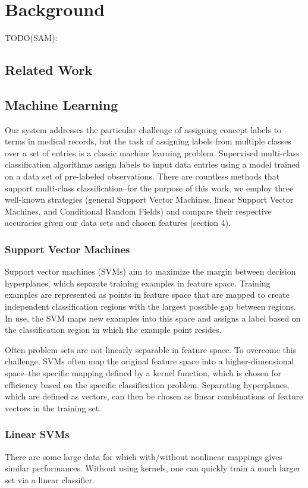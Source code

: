 \documentclass[preprint]{style}
\begin{document}
\section{Background}
TODO(SAM):
\subsection{Related Work}

\subsection{Machine Learning}

Our system addresses the particular challenge of assigning concept labels to terms in medical records, but the task of assigning labels from multiple classes over a set of entries is a classic machine learning problem. Supervised multi-class classification algorithms assign labels to input data entries using a model trained on a data set of pre-labeled observations. There are countless methods that support multi-class classification--for the purpose of this work, we employ three well-known strategies (general Support Vector Machines, linear Support Vector Machines, and Conditional Random Fields) and compare their respective accuracies given our data sets and chosen features (section 4).

\subsubsection{Support Vector Machines}
Support vector machines (SVMs) aim to maximize the margin between decision hyperplanes, which separate training examples in feature space. Training examples are represented as points in feature space that are mapped to create independent classification regions with the largest possible gap between regions. In use, the SVM maps new examples into this space and assigns a label based on the classification region in which the example point resides. 

Often problem sets are not linearly separable in feature space. To overcome this challenge, SVMs often map the original feature space into a higher-dimensional space--the specific mapping defined by a kernel function, which is chosen for efficiency based on the specific classification problem. Separating hyperplanes, which are defined as vectors, can then be chosen as linear combinations of feature vectors in the training set.

\subsubsection{Linear SVMs}
There are some large data for which with/without nonlinear mappings gives similar performances. Without using kernels, one can quickly train a much larger set via a linear classifier. 
\end{document}
